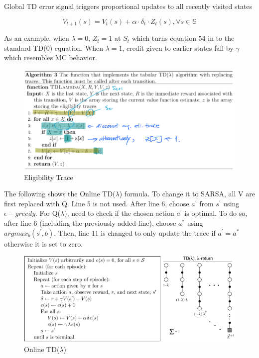 \documentclass{article}
\begin{document}
\noindent
Global TD error signal triggers proportional updates to all recently visited
states

\begin{equation}
V_{t+1}(s)=V_{t}(s)+\alpha \cdot \delta_{t} \cdot Z_{t}(s), \forall s \in \mathbb{S}
\end{equation}

\noindent
As an example, when $\lambda = 0$, $Z_{t} = 1$ at $S_{t}$ which turns equation
54 in to the standard TD(0) equation. When $\lambda = 1$, credit given to
earlier states fall by $\gamma$ which resembles MC behavior.

\begin{figure}[h]
\includegraphics[scale=0.4]{elgibility_trace}
\centering
\caption{Eligibility Trace}
\end{figure}

\newpage
\noindent
The following shows the Online TD($\lambda$) formula. To change it to SARSA, all
V are first replaced with Q. Line 5 is not used. After line 6, choose
$a^{\prime}$ from $s^{\prime}$ using $\epsilon-greedy$. For Q($\lambda$), need
to check if the chosen action $a^{\prime}$ is optimal. To do so, after line 6
(including the previously added line), choose $a^{*}$ using
$argmax_{b}(s^{\prime},b)$. Then, line 11 is changed to only update the trace if
$a^{\prime} = a^{*}$ otherwise it is set to zero.

\begin{figure}[h]
\includegraphics[scale=0.5]{eligibility_trace_online}
\centering
\caption{Online TD($\lambda$)}
\end{figure}
\end{document}
